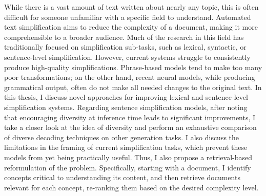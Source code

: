 While there is a vast amount of text written about nearly any topic, this is often difficult for someone unfamiliar with a specific field to understand. Automated text simplification aims to reduce the complexity of a document, making it more comprehensible to a broader audience. Much of the research in this field has traditionally focused on simplification sub-tasks, such as lexical, syntactic, or sentence-level simplification. However, current systems struggle to consistently produce high-quality simplifications. Phrase-based models tend to make too many poor transformations; on the other hand, recent neural models, while producing grammatical output, often do not make all needed changes to the original text. In this thesis, I discuss novel approaches for improving lexical and sentence-level simplification systems. Regarding sentence simplification models, after noting that encouraging diversity at inference time leads to significant improvements, I take a closer look at the idea of diversity and perform an exhaustive comparison of diverse decoding techniques on other generation tasks. I also discuss the limitations in the framing of current simplification tasks, which prevent these models from yet being practically useful. Thus, I also propose a retrieval-based reformulation of the problem. Specifically, starting with a document, I identify concepts critical to understanding its content, and then retrieve documents relevant for each concept, re-ranking them based on the desired complexity level.

